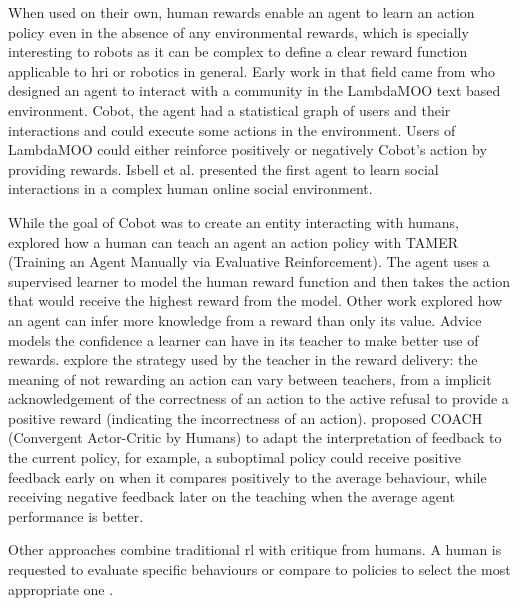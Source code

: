 When used on their own, human rewards enable an agent to learn an action policy even in the absence of any environmental rewards, which is specially interesting to robots as it can be complex to define a clear reward function applicable to \gls{hri} or robotics in general. Early work in that field came from \cite{isbell2006cobot} who designed an agent to interact with a community in the LambdaMOO text based environment. Cobot, the agent had a statistical graph of users and their interactions and could execute some actions in the environment. Users of LambdaMOO could either reinforce positively or negatively Cobot's action by providing rewards. Isbell et al. presented the first agent to learn social interactions in a complex human online social environment. 

While the goal of Cobot was to create an entity interacting with humans, \cite{knox2009interactively} explored how a human can teach an agent an action policy with TAMER (Training an Agent Manually via Evaluative Reinforcement). The agent uses a supervised learner to model the human reward function and then takes the action that would receive the highest reward from the model. Other work explored how an agent can infer more knowledge from a reward than only its value. Advice \citep{griffith2013policy} models the confidence a learner can have in its teacher to make better use of rewards. \cite{loftin2016learning} explore the strategy used by the teacher in the reward delivery: the meaning of not rewarding an action can vary between teachers, from a implicit acknowledgement of the correctness of an action to the active refusal to provide a positive reward (indicating the incorrectness of an action). \cite{macglashan2017interactive} proposed COACH (Convergent Actor-Critic by Humans) to adapt the interpretation of feedback to the current policy, for example, a suboptimal policy could receive positive feedback early on when it compares positively to the average behaviour, while receiving negative feedback later on the teaching when the average agent performance is better.

Other approaches combine traditional \gls{rl} with critique from humans. A human is requested to evaluate specific behaviours \citep{judah2010reinforcement} or compare to policies to select the most appropriate one \citep{christiano2017deep}.


